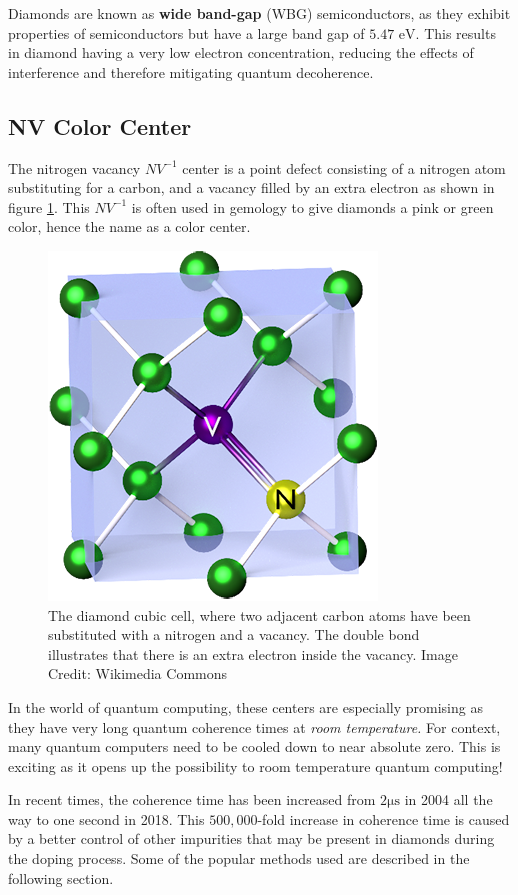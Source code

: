\documentclass[12pt]{article}
\begin{document}
    Diamonds are known as \textbf{wide band-gap} (WBG) semiconductors, as they exhibit properties of semiconductors but have a large band gap of $5.47\text{ eV}$. This results in diamond having a very low electron concentration, reducing the effects of interference and therefore mitigating quantum decoherence.
    \subsection{NV Color Center}
    The nitrogen vacancy $NV^{-1}$ center is a point defect consisting of a nitrogen atom substituting for a carbon, and a vacancy filled by an extra electron as shown in figure \ref{fig:NV}. This $NV^{-1}$ is often used in gemology to give diamonds a pink or green color, hence the name as a color center\cite{best}.
    \begin{figure}[h]
        \centering
        \includegraphics[width=0.3\linewidth]{figures/NV.png}
        \caption{The diamond cubic cell, where two adjacent carbon atoms have been substituted with a nitrogen and a vacancy. The double bond illustrates that there is an extra electron inside the vacancy. Image Credit: Wikimedia Commons}
        \label{fig:NV}
    \end{figure}
    In the world of quantum computing, these centers are especially promising as they have very long quantum coherence times at \textit{room temperature.} For context, many quantum computers need to be cooled down to near absolute zero. This is exciting as it opens up the possibility to room temperature quantum computing!

    In recent times, the coherence time has been increased from $2\si{\micro\second}$ in 2004\cite{best} all the way to one second in 2018\cite{Abobeih2018}. This $500,000$-fold increase in coherence time is caused by a better control of other impurities that may be present in diamonds during the doping process. Some of the popular methods used are described in the following section.
\end{document}
